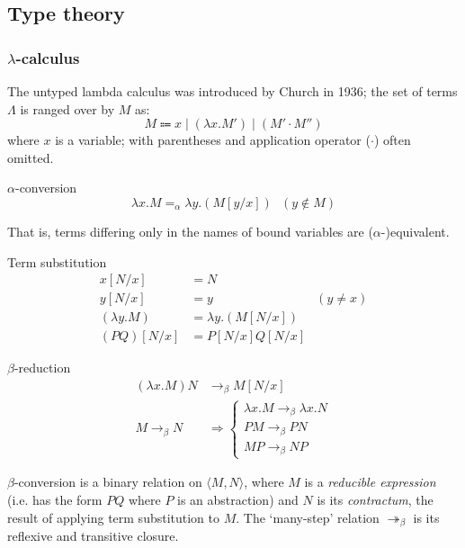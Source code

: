 \subsection{Type theory}\label{bg:types}

\subsubsection{$\lambda$-calculus}\label{bg:types:lambda-calculus}
The untyped lambda calculus was introduced by Church in 1936; the set of terms $\Lambda$ is ranged over by $M$ as: $$
M \Coloneqq x \mid (\lambda{x}.M') \mid (M' \cdot M'')
$$ where $x$ is a variable; with parentheses and application operator ($\cdot$) often omitted. \cite{tsfpl}

\begin{defn}$\alpha$-conversion\label{def:types:alpha-conversion}
	$$
	\lambda{x}.M =_{\alpha} \lambda{y}.(M[y/x]) \ \ \ (y\notin{M})
	$$
\end{defn}

That is, terms differing only in the names of bound variables are ($\alpha$-)equivalent.

\begin{defn}Term substitution\label{def:types:term-substitution}
	$$
	\begin{aligned}
		x[N/x] &= N \\
		y[N/x] &= y &(y \neq x) \\
		(\lambda{y}.M) &= \lambda{y}.(M[N/x]) \\
		(PQ)[N/x] &= P[N/x]Q[N/x]
	\end{aligned}
	$$
\end{defn}

\begin{defn}$\beta$-reduction\label{def:types:beta-conversion}
	$$
	\begin{aligned}
		(\lambda{x}.M)N &\to_{\beta} M[N/x] \\
		M \to_{\beta} N &\Rightarrow \begin{cases}
 			\lambda{x}.M \to_{\beta} \lambda{x}.N \\
 			PM \to_{\beta} PN \\
 			MP \to_{\beta} NP
 		\end{cases}
	\end{aligned}
	$$
\end{defn}

$\beta$-conversion is a binary relation on $\langle{M,N}\rangle$, where $M$ is a \emph{reducible expression} (i.e. has the form $PQ$ where $P$ is an abstraction) and $N$ is its \emph{contractum}, the result of applying term substitution to $M$. The `many-step' relation $\twoheadrightarrow_{\beta}$ is its reflexive and transitive closure. \cite{tsfpl}

